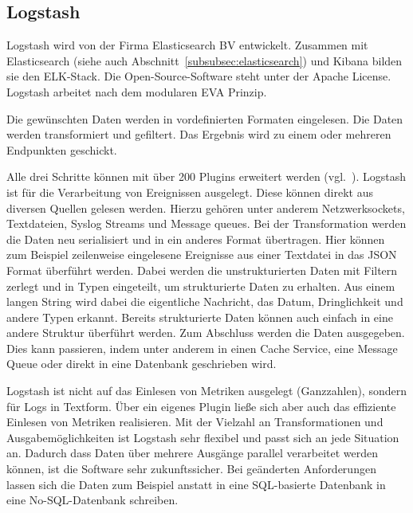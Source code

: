 \subsection{Logstash}
\label{subsec:logstash}
Logstash wird von der Firma Elasticsearch BV entwickelt. Zusammen mit
Elasticsearch (siehe auch Abschnitt~\ref{subsubsec:elasticsearch}) und
\gls{Kibana} bilden sie den ELK-Stack. Die Open-Source-Software steht unter der
Apache License. Logstash arbeitet nach dem modularen \gls{EVA} Prinzip.

\begin{outline}
  \1 Die gewünschten Daten werden in vordefinierten Formaten eingelesen.
  \1 Die Daten werden transformiert und gefiltert.
  \1 Das Ergebnis wird zu einem oder mehreren Endpunkten geschickt.
\end{outline}

Alle drei Schritte können mit über 200 Plugins erweitert
werden (vgl.~\cite{logstash_overview}). Logstash ist für die Verarbeitung von
Ereignissen ausgelegt. Diese können direkt aus diversen Quellen gelesen werden.
Hierzu gehören unter anderem Netzwerksockets, Textdateien, Syslog Streams und
Message queues. Bei der Transformation werden die Daten neu serialisiert und in
ein anderes Format übertragen. Hier können zum Beispiel zeilenweise eingelesene
Ereignisse aus einer Textdatei in das \gls{JSON} Format überführt werden. Dabei
werden die unstrukturierten Daten mit Filtern zerlegt und in Typen eingeteilt,
um strukturierte Daten zu erhalten. Aus einem langen String wird dabei die
eigentliche Nachricht, das Datum, Dringlichkeit und andere Typen erkannt.
Bereits strukturierte Daten können auch einfach in eine andere Struktur
überführt werden. Zum Abschluss werden die Daten ausgegeben. Dies kann
passieren, indem unter anderem in einen Cache Service, eine Message Queue oder
direkt in eine Datenbank geschrieben wird.

Logstash ist nicht auf das Einlesen von Metriken ausgelegt (Ganzzahlen),
sondern für Logs in Textform. Über ein eigenes Plugin ließe sich aber auch das
effiziente Einlesen von Metriken realisieren. Mit der Vielzahl an
Transformationen und Ausgabemöglichkeiten ist Logstash sehr flexibel und passt
sich an jede Situation an. Dadurch dass Daten über mehrere Ausgänge parallel
verarbeitet werden können, ist die Software sehr zukunftssicher. Bei geänderten
Anforderungen lassen sich die Daten zum Beispiel anstatt in eine SQL-basierte
Datenbank in eine No-SQL-Datenbank schreiben.
\tm%

